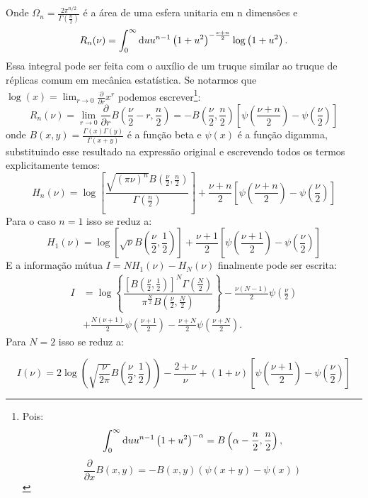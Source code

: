Onde $\Omega_n = \frac{2\pi^{n/2}}{\Gamma\left(\frac{n}{2}\right)}$ é a área de uma esfera unitaria em n dimensões e \[R_n(\nu) = \int_{0}^\infty \mathrm{d} u u^{n-1} \left(1+u^2\right)^{-\frac{\nu+n}{2}}\log\left(1 + u^2\right). \] Essa integral pode ser feita com o auxílio de um truque similar ao truque de réplicas comum em mecânica estatística. Se notarmos que $\log(x) = \lim_{r\to 0}\frac{\partial}{\partial r}x^r$ podemos escrever\footnote{Pois: \[\int_{0}^\infty \mathrm{d} u u^{n-1} \left(1+u^2\right)^{-\alpha} = B\left(\alpha - \frac{n}{2}, \frac{n}{2}\right),\]\[\frac{\partial}{\partial x} B(x,y) = - B(x,y) (\psi(x+y) - \psi(x))\]}:
\[
R_n(\nu) = \lim_{r\to 0} \frac{\partial}{\partial r}B\left(\frac{\nu}{2}-r, \frac{n}{2}\right) = - B\left(\frac{\nu}{2}, \frac{n}{2}\right)\left[\psi\left(\frac{\nu+n}{2}\right) -\psi\left(\frac{\nu}{2}\right)\right]
\]
onde $B(x,y) = \frac{\Gamma(x)\Gamma(y)}{\Gamma(x+y)}$ é a função beta e $\psi(x)$ é a função digamma, substituindo esse resultado na expressão original e escrevendo todos os termos explicitamente temos:
\begin{equation}
H_n(\nu) = \log\left[\frac{\sqrt{(\pi\nu)^{n}}B\left(\frac{\nu}{2}, \frac{n}{2}\right)}{\Gamma\left(\frac{n}{2}\right)}\right] + \frac{\nu + n}{2} \left[\psi\left(\frac{\nu+n}{2}\right) -\psi\left(\frac{\nu}{2}\right)\right]
\end{equation}
Para o caso $n=1$ isso se reduz a:
\begin{equation}
H_1(\nu) = \log\left[\sqrt{\nu}B\left(\frac{\nu}{2}, \frac{1}{2}\right)\right] + \frac{\nu + 1}{2} \left[\psi\left(\frac{\nu+1}{2}\right) -\psi\left(\frac{\nu}{2}\right)\right]
\end{equation}
E a informação mútua $I = N H_1(\nu) - H_N(\nu)$ finalmente pode ser escrita:
\begin{align*}
 I  & = \log\left\lbrace\dfrac{\left[B\left(\frac{\nu}{2},\frac{1}{2}\right)\right]^N\Gamma\left(\frac{N}{2}\right)}{\pi^{\frac{N}{2}}B\left(\frac{\nu}{2},\frac{N}{2}\right)}\right\rbrace  - \frac{\nu(N-1)}{2}\psi\left(\frac{\nu}{2}\right) \\ & +\frac{N(\nu+1)}{2}\psi\left(\frac{\nu + 1 }{2}\right) - \frac{\nu+N}{2}\psi\left(\frac{\nu + N}{2}\right).
\end{align*}
Para $N = 2$ isso se reduz a:
\begin{fullwidth}
\centering
\begin{equation}
  \label{eq:excesst}
  I(\nu) = 2\log\left(\sqrt{\frac{\nu}{2\pi}}B\left(\frac{\nu}{2},\frac{1}{2}\right) \right) - \frac{2+\nu}{\nu} + (1+\nu)\left[ \psi \left(\frac{\nu+1}{2}\right) - \psi \left(\frac{\nu}{2}\right) \right]
\end{equation}
\end{fullwidth}

